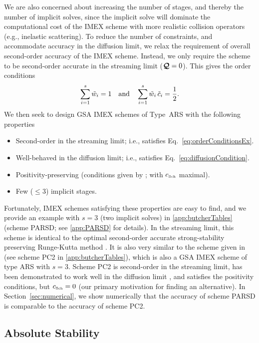 We are also concerned about increasing the number of stages, and thereby the number of implicit solves, since the implicit solve will dominate the computational cost of the IMEX scheme with more realistic collision operators (e.g., inelastic scattering).  
To reduce the number of constraints, and accommodate accuracy in the diffusion limit, we relax the requirement of overall second-order accuracy of the IMEX scheme.  
Instead, we only require the scheme to be second-order accurate in the streaming limit ($\boldsymbol{\mathcal{Q}}=0$).  
This gives the order conditions
\begin{equation}
  \sum_{i=1}^{s}\tilde{w}_{i}=1
  \quad\text{and}\quad
  \sum_{i=1}^{s}\tilde{w}_{i}\,\tilde{c}_{i}=\frac{1}{2}.  
  \label{eq:orderConditionsEx}
\end{equation}
We then seek to design GSA IMEX schemes of Type~ARS with the following properties
\begin{itemize}
  \item Second-order in the streaming limit; i.e., satisfies Eq.~\eqref{eq:orderConditionsEx}.
  \item Well-behaved in the diffusion limit; i.e., satisfies Eq.~\eqref{eq:diffusionCondition}.
  \item Positivity-preserving (conditions given by \cite{hu_etal_2018}; with $c_{\mbox{\tiny Sch}}$ maximal).
  \item Few ($\le3$) implicit stages.
\end{itemize}
Fortunately, IMEX schemes satisfying these properties are easy to find, and we provide an example with $s=3$ (two implicit solves) in \ref{app:butcherTables} (scheme PARSD; see \ref{app:PARSD} for details).  
In the streaming limit, this scheme is identical to the optimal second-order accurate strong-stability preserving Runge-Kutta method \cite{gottlieb_etal_2001}.  
It is also very similar to the scheme given in \cite{mcclarren_etal_2008} (see scheme PC2 in \ref{app:butcherTables}), which is also a GSA IMEX scheme of type ARS with $s=3$.  
Scheme PC2 is second-order in the streaming limit, has been demonstrated to work well in the diffusion limit \cite{mcclarren_etal_2008,radice_etal_2013}, and satisfies the positivity conditions, but $c_{\mbox{\tiny Sch}}=0$ (our primary motivation for finding an alternative).  
In Section~\ref{sec:numerical}, we show numerically that the accuracy of scheme PARSD is comparable to the accuracy of scheme PC2.  

\subsection{Absolute Stability}

